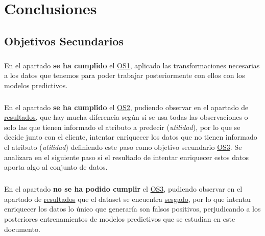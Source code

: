 \chapter{Conclusiones}
\label{chapter:conclusiones}

\section{Objetivos Secundarios}

\paragraph{}
En el apartado  \textbf{se ha cumplido} el \hyperref[os:OS1]{OS1}, aplicado las transformaciones necesarias a los datos que tenemos para poder trabajar posteriormente con ellos con los modelos predictivos.

\paragraph{}
En el apartado  \textbf{se ha cumplido} el \hyperref[os:OS2]{OS2}, pudiendo observar en el apartado de \hyperref[resultados:pca]{resultados}, que hay mucha diferencia según si se usa todas las observaciones o solo las que tienen informado el atributo a predecir (\textit{utilidad}), por lo que se decide junto con el cliente, intentar enriquecer los datos que no tienen informado el atributo (\textit{utilidad}) definiendo este paso como objetivo secundario \hyperref[os:OS3]{OS3}. Se analizara en el siguiente paso si el resultado de intentar enriquecer estos datos aporta algo al conjunto de datos.

\paragraph{}
En el apartado  \textbf{no se ha podido cumplir} el \hyperref[os:OS3]{OS3}, pudiendo observar en el apartado de \hyperref[resultados:knn]{resultados} que el dataset se encuentra \hyperref[resultados:knn_conclusiones]{sesgado}, por lo que intentar enriquecer los datos lo único que generaría son falsos positivos, perjudicando a los posteriores entrenamientos de modelos predictivos que se estudian en este documento.
